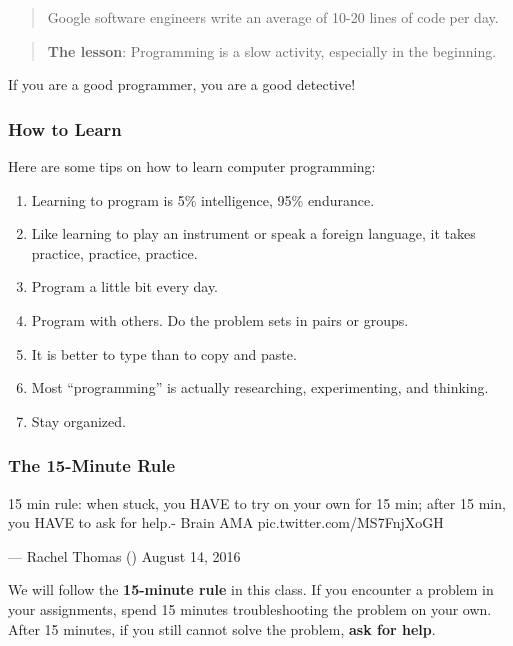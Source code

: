 \documentclass[
]{book}
\providecommand{\tightlist}{%
  \setlength{\itemsep}{0pt}\setlength{\parskip}{0pt}}
\begin{document}
\begin{quote}
Google software engineers write an average of 10-20 lines of code per day.
\end{quote}

\begin{quote}
\textbf{The lesson}: Programming is a slow activity, especially in the beginning.
\end{quote}

If you are a good programmer, you are a good detective!

\hypertarget{how-to-learn}{%
\subsubsection*{How to Learn}\label{how-to-learn}}

Here are some tips on how to learn computer programming:

\begin{enumerate}
\def\labelenumi{\arabic{enumi}.}
\tightlist
\item
  Learning to program is 5\% intelligence, 95\% endurance.
\item
  Like learning to play an instrument or speak a foreign language, it takes practice, practice, practice.
\item
  Program a little bit every day.
\item
  Program with others. Do the problem sets in pairs or groups.
\item
  It is better to type than to copy and paste.
\item
  Most ``programming'' is actually researching, experimenting, and thinking.
\item
  Stay organized.
\end{enumerate}

\hypertarget{the-15-minute-rule}{%
\subsubsection*{The 15-Minute Rule}\label{the-15-minute-rule}}

15 min rule: when stuck, you HAVE to try on your own for 15 min; after 15 min, you HAVE to ask for help.- Brain AMA pic.twitter.com/MS7FnjXoGH

--- Rachel Thomas (\citet{math_rachel}) August 14, 2016

We will follow the \textbf{15-minute rule} in this class. If you encounter a problem in your assignments, spend 15 minutes troubleshooting the problem on your own. After 15 minutes, if you still cannot solve the problem, \textbf{ask for help}.
\end{document}
